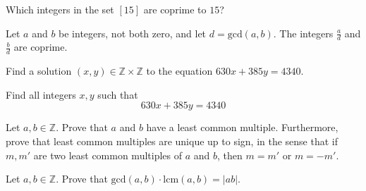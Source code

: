 \begin{exercise}
\label{exCoprimeTo15}
Which integers in the set $[15]$ are coprime to $15$?
\end{exercise}


\begin{exercise}
\label{exDivByGCDIsCoprime}
Let $a$ and $b$ be integers, not both zero, and let $d = \mathrm{gcd}(a,b)$. The integers $\frac{a}{d}$ and $\frac{b}{d}$ are coprime.
\end{exercise}


\begin{exercise}
Find a solution $(x,y) \in \mathbb{Z} \times \mathbb{Z}$ to the equation $630x + 385y = 4340$.
\end{exercise}


\begin{exercise}
Find all integers $x,y$ such that
\[ 630x + 385y = 4340 \]
\end{exercise}

\begin{exercise}
\label{exLCMExistsUnique}
Let $a,b \in \mathbb{Z}$. Prove that $a$ and $b$ have a least common multiple. Furthermore, prove that least common multiples are unique up to sign, in the sense that if $m,m'$ are two least common multiples of $a$ and $b$, then $m=m'$ or $m=-m'$.
\end{exercise}


\begin{exercise}
\label{exProductOfIntegersIsProductOfGCDAndLCM}
Let $a,b \in \mathbb{Z}$. Prove that $\mathrm{gcd}(a,b) \cdot \mathrm{lcm}(a,b) = |ab|$.
\end{exercise}
